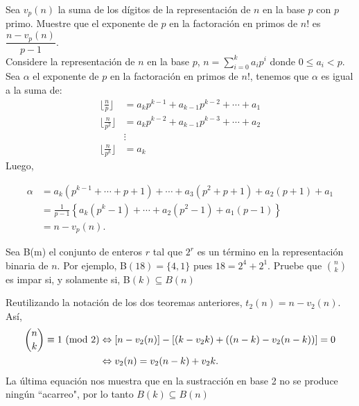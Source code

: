	\begin{thm}
		Sea $v_{p}(n)$ la suma de los d\'igitos de la representaci\'on de $n$ en la base $p$ con $p$ primo. Muestre que el exponente de $p$ en la factoraci\'on en primos de $n!$ es $\dfrac{n-v_{p}(n)}{p-1}.$\\ 
		
		Considere la representaci\'on de $n$ en la base $p$, $n = \displaystyle\sum_{i = 0}^{k} a_{i}p^{i}$ donde $0 \leq a_{i} < p$. Sea $\alpha$ el exponente de $p$ en la factoraci\'on en primos de $n!$, tenemos que $\alpha$ es igual a la suma de: \\
		\begin{align*}
			\Biggl\lfloor \frac{n}{p} \Biggr\rfloor &= a_{k}p^{k - 1} + a_{k - 1}p^{k - 2} + \cdots + a_{1}\\
			\Biggl\lfloor \frac{n}{p^{2}} \Biggr\rfloor &=  a_{k}p^{k - 2} + a_{k - 1}p^{k - 3} + \cdots + a_{2}\\
			&\vdots\\
			\Biggl\lfloor \frac{n}{p^{k}} \Biggr\rfloor &= a_{k}
		\end{align*}
		Luego,  
		
		\begin{align*}
			\alpha &= a_{k}(p^{k-1} + \cdots + p + 1) + \cdots + a_{3}(p^{2} + p +1) + a_{2}(p + 1) + a_{1} \\
			&= \frac{1}{p-1} \left\{a_{k}(p^{k} - 1) + \cdots + a_{2}(p^{2} - 1) + a_{1}(p - 1)\right\} \\
			&= n-v_{p}(n). 
		\end{align*}		
	\end{thm}
	\begin{ej}
		Sea B(m) el conjunto de enteros $r$ tal que  $2^{r}$ es un t\'ermino en la representaci\'on binaria de $n$. Por ejemplo, B$(18) = \{4,1\}$ pues $18 = 2^{4} + 2^{1}$. Pruebe que $\binom{n}{k}$ es impar si, y solamente si, B$(k) \subseteq B(n)$
		
		Reutilizando la notaci\'on de los dos teoremas anteriores, $t_{2}(n) = n- v_{2}(n)$. As\'i,
		\begin{align*}
			\binom{n}{k} \equiv 1 \ (\mathrm{mod}\ 2) &\Leftrightarrow [n - v_{2}(n)] - [(k - v_{2}{k}) + ((n - k) - v_{2}(n - k))] = 0\\
			 &\Leftrightarrow v_{2}(n) =  v_{2}(n - k) + v_{2}{k}.
		\end{align*}
		La \'ultima equaci\'on nos muestra que en la sustracci\'on en base 2 no se produce ning\'un ``acarreo", por lo tanto $B(k) \subseteq B(n)$  
	\end{ej}
